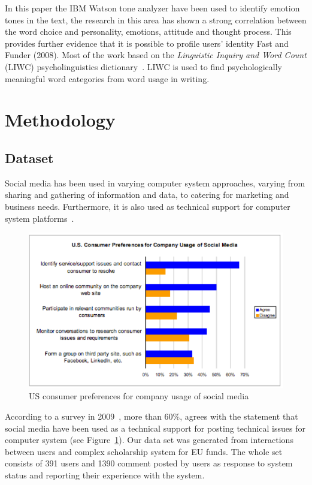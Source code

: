 \documentclass[graybox]{svmult}
\begin{document}
In this paper the IBM Watson tone analyzer have been used to identify
emotion tones in the text, the research in this area has shown a
strong correlation between the word choice and personality, emotions,
attitude and thought process. This provides further evidence that it
is possible to profile users’ identity Fast and Funder (2008). Most of
the work based on the {\emph{Linguistic Inquiry and Word Count}}
(LIWC) psycholinguistics
dictionary~\citep{pennebaker-et-al:2001,tausczik+pennebaker:2010}.
LIWC is used to find psychologically meaningful word categories from
word usage in writing.

\section{Methodology}\label{method}

\subsection{Dataset}

Social media has been used in varying computer system approaches,
varying from sharing and gathering of information and data, to
catering for marketing and business needs. Furthermore, it is also
used as technical support for computer system
platforms~\citep{thompson:2009}.

\begin{figure}[!ht]
\centering
\includegraphics[width=\columnwidth]{images/socialmediause}
\caption{US consumer preferences for company usage of social media~\citep{thompson:2009}}
\label{fig:socialmediause} 
\end{figure}

According to a survey in 2009~\citep{thompson:2009}, more than 60\%,
agrees with the statement that social media have been used as a
technical support for posting technical issues for computer system
(see Figure~\ref{fig:socialmediause}). Our data set was generated from
interactions between users and complex scholarship system for EU
funds. The whole set consists of 391 users and 1390 comment posted by
users as response to system status and reporting their experience with
the system.
\end{document}
